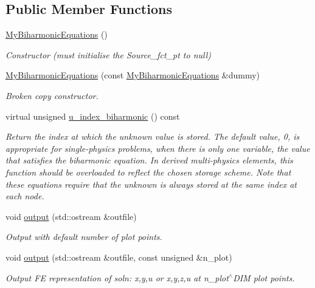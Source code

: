 \subsection*{Public Member Functions}
\begin{DoxyCompactItemize}
\item 
\hyperlink{classoomph_1_1MyBiharmonicEquations_ab5084decf9d75cee91f0e88fb4f62c86}{My\+Biharmonic\+Equations} ()
\begin{DoxyCompactList}\small\item\em Constructor (must initialise the Source\+\_\+fct\+\_\+pt to null) \end{DoxyCompactList}\item 
\hyperlink{classoomph_1_1MyBiharmonicEquations_a3cf0e0a63e46219b94195aa4ab926316}{My\+Biharmonic\+Equations} (const \hyperlink{classoomph_1_1MyBiharmonicEquations}{My\+Biharmonic\+Equations} \&dummy)
\begin{DoxyCompactList}\small\item\em Broken copy constructor. \end{DoxyCompactList}\item 
virtual unsigned \hyperlink{classoomph_1_1MyBiharmonicEquations_aecad5ed2e1534519b81e778c5dff6457}{u\+\_\+index\+\_\+biharmonic} () const
\begin{DoxyCompactList}\small\item\em Return the index at which the unknown value is stored. The default value, 0, is appropriate for single-\/physics problems, when there is only one variable, the value that satisfies the biharmonic equation. In derived multi-\/physics elements, this function should be overloaded to reflect the chosen storage scheme. Note that these equations require that the unknown is always stored at the same index at each node. \end{DoxyCompactList}\item 
void \hyperlink{classoomph_1_1MyBiharmonicEquations_aa0d1248dcc8fcebd986c295d6af2ebf6}{output} (std\+::ostream \&outfile)
\begin{DoxyCompactList}\small\item\em Output with default number of plot points. \end{DoxyCompactList}\item 
void \hyperlink{classoomph_1_1MyBiharmonicEquations_a9a2734695e94f83eb6d553a7090dbebd}{output} (std\+::ostream \&outfile, const unsigned \&n\+\_\+plot)
\begin{DoxyCompactList}\small\item\em Output FE representation of soln\+: x,y,u or x,y,z,u at n\+\_\+plot$^\wedge$\+D\+IM plot points. \end{DoxyCompactList}\item 

\end{DoxyCompactItemize}
